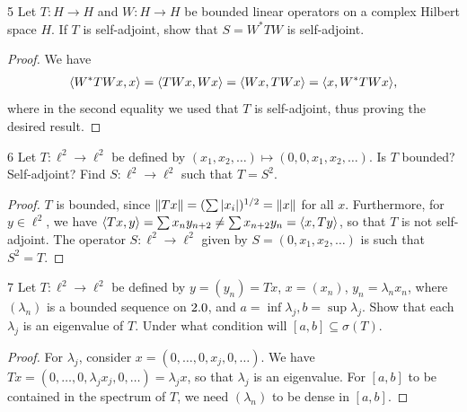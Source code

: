 \begin{exercise}{5}
Let $T: H \to H$ and $W: H \to H$ be bounded linear operators on a complex Hilbert space $H$.
If $T$ is self-adjoint, show that $S = W^\ast T W$ is self-adjoint.
\end{exercise}
\begin{proof}
We have 
\begin{align*}
    \langle W^\ast T W x, x\rangle
    = \langle T W x, W x\rangle
    = \langle W x, T W x\rangle
    = \langle x, W^\ast T W x\rangle,
\end{align*}
where in the second equality we used that $T$ is self-adjoint, thus proving the desired result.
\end{proof} 

\begin{exercise}{6}
Let $T: \ell^2 \to \ell^2$ be defined by $(x_1, x_2, \dots) \mapsto (0, 0, x_1, x_2, \dots)$.
Is $T$ bounded?
Self-adjoint?
Find $S: \ell^2 \to \ell^2$ such that $T = S^2$.
\end{exercise}
\begin{proof}
$T$ is bounded, since $\left\lVert Tx\right\rVert = (\sum \left\lvert x_i\right\rvert)^{1/2} = \left\lVert x\right\rVert$ for all $x$.
Furthermore, for $y \in \ell^2$, we have $\langle Tx, y\rangle = \sum x_n y_{n+2} \neq \sum x_{n+2} y_n = \langle x, Ty\rangle$, so that $T$ is not self-adjoint.
The operator $S: \ell^2 \to \ell^2$ given by $S = (0, x_1, x_2, \dots)$ is such that $S^2 = T$.
\end{proof} 

\begin{exercise}{7}
Let $T: \ell^2 \to \ell^2$ be defined by $y = (y_n) = T x$, $x = (x_n)$, $y_n = \lambda_n x_n$, where $(\lambda_n)$ is a bounded sequence on $2.0$, and $a = \inf \lambda_j, b = \sup \lambda_j$.
Show that each $\lambda_j$ is an eigenvalue of $T$.
Under what condition will $[a, b] \subseteq \sigma(T)$.
\end{exercise}
\begin{proof}
For $\lambda_j$, consider $x = (0, \dots, 0, x_j, 0, \dots)$.
We have $Tx = (0, \dots, 0, \lambda_j x_j, 0, \dots) = \lambda_j x$, so that $\lambda_j$ is an eigenvalue.
For $[a, b]$ to be contained in the spectrum of $T$, we need $(\lambda_n)$ to be dense in $[a, b]$.
\end{proof} 

